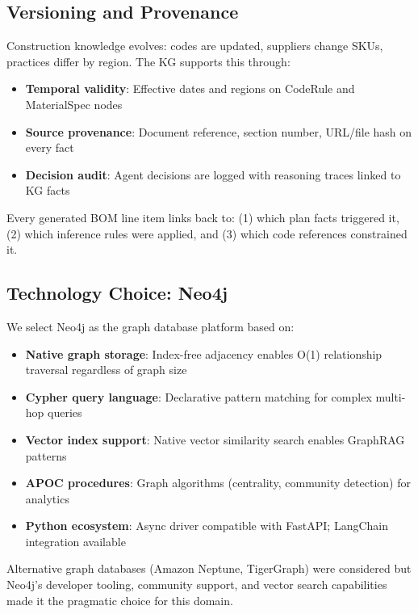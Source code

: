 \subsection{Versioning and Provenance}

Construction knowledge evolves: codes are updated, suppliers change SKUs, practices differ by region.
The KG supports this through:

\begin{itemize}
  \item \textbf{Temporal validity}: Effective dates and regions on CodeRule and MaterialSpec nodes
  \item \textbf{Source provenance}: Document reference, section number, URL/file hash on every fact
  \item \textbf{Decision audit}: Agent decisions are logged with reasoning traces linked to KG facts
\end{itemize}

Every generated BOM line item links back to: (1) which plan facts triggered it, (2) which inference rules were applied, and (3) which code references constrained it.

\subsection{Technology Choice: Neo4j}

We select Neo4j as the graph database platform based on:

\begin{itemize}
  \item \textbf{Native graph storage}: Index-free adjacency enables O(1) relationship traversal regardless of graph size~\cite{neo4j2023construction}
  \item \textbf{Cypher query language}: Declarative pattern matching for complex multi-hop queries
  \item \textbf{Vector index support}: Native vector similarity search enables GraphRAG patterns~\cite{edge2024graphrag, lewis2020rag}
  \item \textbf{APOC procedures}: Graph algorithms (centrality, community detection) for analytics
  \item \textbf{Python ecosystem}: Async driver compatible with FastAPI; LangChain integration available
\end{itemize}

Alternative graph databases (Amazon Neptune, TigerGraph) were considered but Neo4j's developer tooling, community support, and vector search capabilities made it the pragmatic choice for this domain.
